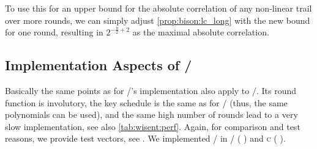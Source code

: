 To use this for an upper bound for the absolute correlation of any non-linear trail over more rounds, we can simply adjust \cref{prop:bison:lc_long} with the new bound for one round, resulting in $2^{-\frac{n}{2}+2}$ as the maximal absolute correlation.

\subsection{Implementation Aspects of \wisent/}\label{sec:wisent:implementation}


Basically the same points as for \bison/'s implementation also apply to \wisent/.
Its round function is involutory, the key schedule is the same as for \bison/ (thus, the same polynomials can be used), and the same high number of rounds lead to a very slow implementation, see also \cref{tab:wisent:perf}.
Again, for comparison and test reasons, we provide test vectors, see
\cite[Appendix~D]{EPRINT:CLLNW18}%
.
We implemented \wisent/ in \sage/ (%
\cite[Appendix~F]{EPRINT:CLLNW18}%
) and \textsc{c} (%
\cite[Appendix~H]{EPRINT:CLLNW18}%
).


